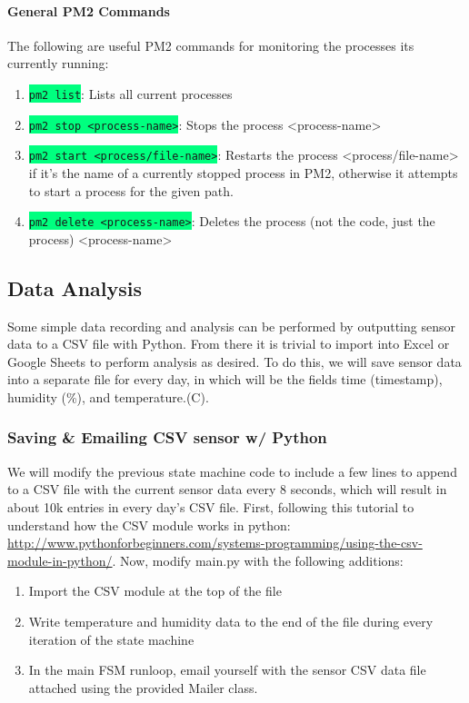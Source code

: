 \documentclass{article}
\newcommand{\codei}[1]{\colorbox{SpringGreen}{\texttt{#1}}} %
\begin{document}
    \paragraph{General PM2 Commands}
    The following are useful PM2 commands for monitoring the processes its currently running:
    \begin{enumerate}
        \item \codei{pm2 list}: Lists all current processes
        \item \codei{pm2 stop <process-name>}: Stops the process <process-name>
        \item \codei{pm2 start <process/file-name>}: Restarts the process <process/file-name> if it's the name of a currently stopped process in PM2, otherwise it attempts to start a process for the given path.
        \item \codei{pm2 delete <process-name>}: Deletes the process (not the code, just the process) <process-name>
    \end{enumerate}


\subsection{Data Analysis}
Some simple data recording and analysis can be performed by outputting sensor data to a CSV file with Python. From there it is trivial to import into Excel or Google Sheets to perform analysis as desired. To do this, we will save sensor data into a separate file for every day, in which will be the fields time (timestamp), humidity (\%), and temperature.(\degree C).
  \subsubsection{Saving \& Emailing CSV sensor w/ Python}
  We will modify the previous state machine code to include a few lines to append to a CSV file with the current sensor data every 8 seconds, which will result in about 10k entries in every day's CSV file. First, following this tutorial to understand how the CSV module works in python:
  \href{http://www.pythonforbeginners.com/systems-programming/using-the-csv-module-in-python/}{http://www.pythonforbeginners.com/systems-programming/using-the-csv-module-in-python/}.
  Now, modify main.py with the following additions:
  \begin{enumerate}
      \item Import the CSV module at the top of the file
      \item Write temperature and humidity data to the end of the file during every iteration of the state machine
      \item In the main FSM runloop, email yourself with the sensor CSV data file attached using the provided Mailer class.
  \end{enumerate}
\end{document}
